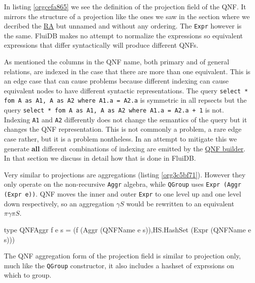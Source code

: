 In listing \ref{orgcefa865} we see the definition of the projection field
of the QNF. It mirrors the structure of a projection like the ones we
saw in the section where we decribed the \hyperref[sec:relational_algebra_semantics]{RA} but unnamed and without
any ordering. The \texttt{Expr} however is the same. FluiDB makes no attempt
to normalize the expressions so equivalent expressions that differ
syntactically will produce different QNFs.

As mentioned the columns in the QNF name, both primary and of general
relations, are indexed in the case that there are more than one
equivalent. This is an edge case that can cause problems because
different indexing can cause equivalent nodes to have different
syntactic representations. The query \texttt{select * fom A as A1, A as A2
  where A1.a = A2.a} is symmetric in all repsects but the query
\texttt{select * fom A as A1, A as A2 where A1.a = A2.a + 1} is not. Indexing
\texttt{A1} and \texttt{A2} differently does not change the semantics of the query
but it changes the QNF representation. This is not commonly a problem,
a rare edge case rather, but it is a problem nontheless. In an attempt
to mitigate this we generate \textbf{all} different combinations of indexing
are emitted by the \hyperref[sec:org3f1036f]{QNF builder}. In that section we discuss in detail
how that is done in FluiDB.

Very similar to projections are aggregations (listing
\ref{org3c5bf71}). However they only operate on the non-recursive \texttt{Aggr}
algebra, while \texttt{QGroup} uses \texttt{Expr (Aggr (Expr e))}. QNF moves the
inner and outer \texttt{Expr} to one level up and one level down
respectively, so an aggregation \(\gamma S\) would be rewritten to an
equivalent \(\pi \gamma \pi S\).

\begin{listing}[p]
  \begin{haskell}
    type QNFAggr f e s =
    (f (Aggr (QNFName e s)),HS.HashSet (Expr (QNFName e s)))
  \end{haskell}
  \caption{\label{org3c5bf71}The QNF aggregation form of the projection field is similar to projection only, much like the \texttt{QGroup} constructor, it also includes a hashset of exprssions on which to group.}
\end{listing}

